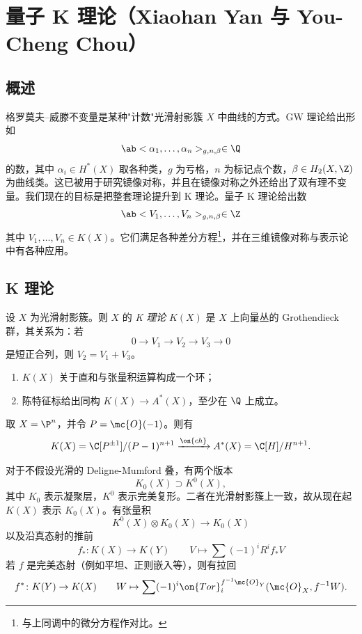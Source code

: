 \section{量子 K 理论（Xiaohan Yan 与 You-Cheng Chou）}%
\label{sec:Quantum K-theory (Xiaohan Yan and You-Cheng Chou)}

\subsection{概述}%
\label{sub:Overview}

格罗莫夫–威滕不变量是某种"计数"光滑射影簇 \(X\) 中曲线的方式。GW 理论给出形如
\[ \ab<\alpha_1, \ldots, \alpha_n>_{g, n, \beta} \in \Q \]
的数，其中 \(\alpha_i \in H^*(X)\) 取各种类，\(g\) 为亏格，\(n\) 为标记点个数，\(\beta \in H_2(X, \Z)\) 为曲线类。这已被用于研究镜像对称，并且在镜像对称之外还给出了双有理不变量。我们现在的目标是把整套理论提升到 K 理论。量子 K 理论给出数
\[ \ab<V_1, \ldots, V_n>_{g, n, \beta} \in \Z \]
其中 \(V_1, \ldots, V_n \in K(X)\)。它们满足各种差分方程\footnote{与上同调中的微分方程作对比。}，并在三维镜像对称与表示论中有各种应用。

\subsection{K 理论}%
\label{sub:K-theory}

\begin{defn}
    设 \(X\) 为光滑射影簇。则 \(X\) 的 \textit{K 理论} \(K(X)\) 是 \(X\) 上向量丛的 Grothendieck 群，其关系为：若
    \[ 0 \to V_1 \to V_2 \to V_3 \to 0 \]
    是短正合列，则 \(V_2 = V_1 + V_3\)。
\end{defn}

\begin{rmk}\leavevmode
    \begin{enumerate}
        \item \(K(X)\) 关于直和与张量积运算构成一个环；
        \item 陈特征标给出同构 \(K(X) \to A^*(X)\)，至少在 \(\Q\) 上成立。
    \end{enumerate}
\end{rmk}

\begin{exm}
    取 \(X = \P^n\)，并令 \(P = \mc{O}(-1)\)。则有
    \[ K(X) = \C[P^{\pm 1}]/(P-1)^{n+1} \xrightarrow{\on{ch}} A^*(X) = \C[H]/H^{n+1}. \]
\end{exm}

对于不假设光滑的 Deligne-Mumford 叠，有两个版本
\[ K_0(X) \supset K^0(X), \]
其中 \(K_0\) 表示凝聚层，\(K^0\) 表示完美复形。二者在光滑射影簇上一致，故从现在起 \(K(X)\) 表示 \(K_0(X)\)。有张量积
\[ K^0(X) \otimes K_0(X) \to K_0(X) \]
以及沿真态射的推前
\[ f_* \colon K(X) \to K(Y) \qquad V \mapsto \sum (-1)^i R^i f_* V \]
若 \(f\) 是完美态射（例如平坦、正则嵌入等），则有拉回
\[ f^* \colon K(Y) \to K(X) \qquad W \mapsto \sum (-1)^i \on{Tor}_i^{f^{-1} \mc{O}_Y} (\mc{O}_X, f^{-1} W). \]

